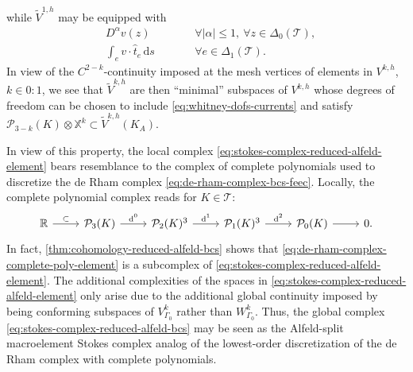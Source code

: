 \documentclass{mcom-l}
\theoremstyle{definition}
\theoremstyle{remark}
\numberwithin{equation}{section}
\newcommand{\unitvec}[1]{\hat{#1}}
\renewcommand{\d}[1]{\,\mathrm{d}{#1}}
\DeclareMathOperator{\dee}{d}
\newcommand{\mesh}[0]{\mathcal{T}}
\begin{document}
while $\tilde{V}^{1, h}$ may be equipped with
\begin{subequations}
	\label{eq:h1curl-dofs}
	\begin{alignat}{2}
		\label{eq:h1curl-dofs-vertices}
		&D^{\alpha} v(z) \qquad & &
		\forall|\alpha| \leq 1, \ \forall z \in \Delta_0(\mesh), \\
		\label{eq:h1curl-dofs-edge-tangents}
		&\int_{e} v \cdot \unitvec{t}_e \d{s} \qquad & &
		\forall e \in \Delta_1(\mesh).
	\end{alignat}
\end{subequations}
In view of the $C^{2-k}$-continuity imposed at the mesh vertices 
of elements in $V^{k, h}$, $k \in 0:1$, we see that 
$\tilde{V}^{k, h}$ are then ``minimal'' subspaces of $V^{k, h}$
whose degrees of freedom can be chosen to include 
\cref{eq:whitney-dofs-currents} and satisfy 
$\mathcal{P}_{3-k}(K) \otimes \mathbb{X}^k \subset \tilde{V}^{k, h}(K_A)$.

In view of this property, the local complex 
\cref{eq:stokes-complex-reduced-alfeld-element} bears 
resemblance to the complex of complete polynomials used to discretize 
the de Rham complex \cref{eq:de-rham-complex-bcs-feec}. 
Locally, the complete polynomial complex reads for $K \in \mesh$:
\begin{equation}
	\label{eq:de-rham-complex-complete-poly-element}
	\begin{tikzcd}
		\mathbb{R} \arrow[r, "\subset"] 
		& \mathcal{P}_{3}(K) \arrow[r, "\dee^0"] 
		& \mathcal{P}_{2}(K)^3 \arrow[r, "\dee^1"] 
		& \mathcal{P}_{1}(K)^3 \arrow[r, "\dee^2"]
		& \mathcal{P}_{0}(K) \arrow[r]
		& 0.
	\end{tikzcd}
\end{equation}
In fact, \cref{thm:cohomology-reduced-alfeld-bcs} shows that 
\cref{eq:de-rham-complex-complete-poly-element} is a subcomplex of 
\cref{eq:stokes-complex-reduced-alfeld-element}. The additional complexities 
of the spaces in \cref{eq:stokes-complex-reduced-alfeld-element} only
arise due to the additional global continuity imposed by being 
conforming subspaces of $V_{\Gamma_0}^{k}$ rather than $W_{\Gamma_0}^{k}$. Thus, the global
complex \cref{eq:stokes-complex-reduced-alfeld-bcs} may be seen as 
the Alfeld-split macroelement Stokes complex analog of the lowest-order 
discretization of the de Rham complex with complete polynomials.
\end{document}
